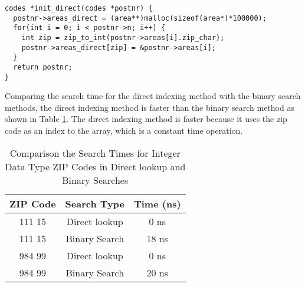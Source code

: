 \documentclass[a4paper,11pt]{article}
\begin{document}
\begin{verbatim}
codes *init_direct(codes *postnr) {
  postnr->areas_direct = (area**)malloc(sizeof(area*)*100000);
  for(int i = 0; i < postnr->n; i++) {
    int zip = zip_to_int(postnr->areas[i].zip_char);
    postnr->areas_direct[zip] = &postnr->areas[i];
  }
  return postnr;
}
\end{verbatim}

Comparing the search time for the direct indexing method with the binary search methods,
the direct indexing method is faster than the binary search method as shown in Table \ref{table:direct_times}.
The direct indexing method is faster because it uses the zip code as an index to the array, which is a constant time operation.

\begin{table}[h!]
  \centering
  \begin{tabular}{|c|c|c|}
    \hline
    \textbf{ZIP Code} & \textbf{Search Type} & \textbf{Time (ns)} \\ \hline
    111 15 & Direct lookup & 0 ns \\ \hline
    111 15 & Binary Search & 18 ns \\ \hline
    984 99 & Direct lookup & 0 ns \\ \hline
    984 99 & Binary Search & 20 ns \\ \hline
  \end{tabular}
  \caption{Comparison the Search Times for Integer Data Type ZIP Codes in Direct lookup and Binary Searches}
  \label{table:direct_times}
\end{table}
\end{document}
